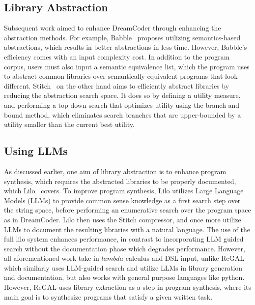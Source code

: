 \subsection{Library Abstraction}
Subsequent work aimed to enhance DreamCoder through enhancing the abstraction methods. For example, Babble~\cite{Cao_2023babble} proposes utilizing semantics-based abstractions, which results in better abstractions in less time. However, Babble's efficiency comes with an input complexity cost. In addition to the program corpus, users must also input a semantic equivalence list, which the program uses to abstract common libraries over semantically equivalent programs that look different. Stitch~\cite{Bowers_2023stitch} on the other hand aims to efficiently abstract libraries by reducing the abstraction search space. It does so by defining a utility measure, and performing a top-down search that optimizes utility using the branch and bound method, which eliminates search branches that are upper-bounded by a utility smaller than the current best utility. 

\subsection{Using LLMs}
As discussed earlier, one aim of library abstraction is to enhance program synthesis, which requires the abstracted libraries to be properly documented, which Lilo~\cite{grand2024lilo} covers. To improve program synthesis, Lilo utilizes Large Language Models (LLMs) to provide common sense knowledge as a first search step over the string space, before performing an enumerative search over the program space as in DreamCoder. Lilo then uses the Stitch compressor, and once more utilize LLMs to document the resulting libraries with a natural language. The use of the full lilo system enhances performance, in contrast to incorporating LLM guided search without the documentation phase which degrades performance. However, all aforementioned work take in \(lambda\)-calculus and DSL input, unlike ReGAL~\cite{stengeleskin2024regal} which similarly uses LLM-guided search and utilize LLMs in library generation and documentation, but also works with general purpose languages like python. However, ReGAL uses library extraction as a step in program synthesis, where its main goal is to synthesize programs that satisfy a given written task. 

